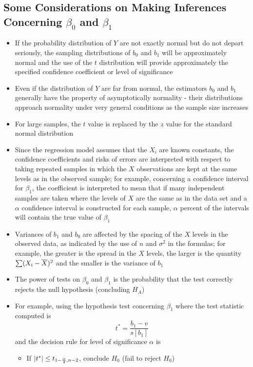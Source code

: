 \subsection{Some Considerations on Making Inferences Concerning $\beta_0$ and $\beta_1$}
\begin{itemize}
\item If the probability distribution of $Y$ are not exactly normal but do not depart seriously, the sampling distributions of $b_0$ and $b_1$ will be approximately normal and the use of the $t$ distribution will provide approximately the specified confidence coefficient or level of significance 
\item Even if the distribution of $Y$ are far from normal, the estimators $b_0$ and $b_1$ generally have the property of asymptotically normality - their distributions approach normality under very general conditions as the sample size increases
\item For large samples, the $t$ value is replaced by the $z$ value for the standard normal distribution
\item Since the regression model assumes that the $X_i$ are known constants, the confidence coefficients and risks of errors are interpreted with respect to taking repeated samples in which the $X$ observations are kept at the same levels as in the observed sample; for example, concerning a confidence interval for $\beta_1$, the coefficient is interpreted to mean that if many independent samples are taken where the levels of $X$ are the same as in the data set and a $\alpha$ confidence interval is constructed for each sample, $\alpha$ percent of the intervals will contain the true value of $\beta_1$
\item Variances of $b_1$ and $b_0$ are affected by the spacing of the $X$ levels in the observed data, as indicated by the use of $n$ and $\sigma^2$ in the formulas; for example, the greater is the spread in the $X$ levels, the larger is the quantity $\sum (X_i - \overline{X})^2$ and the smaller is the variance of $b_1$
\item The power of tests on $\beta_0$ and $\beta_1$ is the probability that the test correctly rejects the null hypothesis (concluding $H_A$)
\item For example, using the hypothesis test concerning $\beta_1$ where  the test statistic computed is $$ t^* = \frac{b_1 - v}{s[b_1]} $$ and the decision rule for level of significance $\alpha$ is \begin{itemize} 
\item If $\abs{t^*} \leq t_{1 - \frac{\alpha}{2}, n-2}$, conclude $H_0$ (fail to reject $H_0$)

\end{itemize}
\end{itemize}
